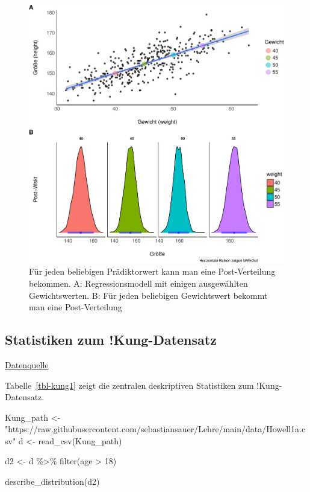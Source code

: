 \documentclass[
  a4paper,
  DIV=11]{scrreprt}
\newenvironment{Shaded}{\begin{snugshade}}{\end{snugshade}}
\newcommand{\DecValTok}[1]{\textcolor[rgb]{0.68,0.00,0.00}{#1}}
\newcommand{\FunctionTok}[1]{\textcolor[rgb]{0.28,0.35,0.67}{#1}}
\newcommand{\NormalTok}[1]{\textcolor[rgb]{0.00,0.23,0.31}{#1}}
\newcommand{\OtherTok}[1]{\textcolor[rgb]{0.00,0.23,0.31}{#1}}
\newcommand{\SpecialCharTok}[1]{\textcolor[rgb]{0.37,0.37,0.37}{#1}}
\newcommand{\StringTok}[1]{\textcolor[rgb]{0.13,0.47,0.30}{#1}}
\theoremstyle{definition}
\theoremstyle{remark}
\begin{document}
\begin{figure}

{\centering \includegraphics[width=1\textwidth,height=\textheight]{./lineare-modelle_files/figure-pdf/fig-post42-1.pdf}

}

\caption{\label{fig-post42}Für jeden beliebigen Prädiktorwert kann man
eine Post-Verteilung bekommen. A: Regressionsmodell mit einigen
ausgewählten Gewichtswerten. B: Für jeden beliebigen Gewichtswert
bekommt man eine Post-Verteilung}

\end{figure}

\hypertarget{statistiken-zum-kung-datensatz}{%
\subsection{Statistiken zum
!Kung-Datensatz}\label{statistiken-zum-kung-datensatz}}

\href{https://raw.githubusercontent.com/sebastiansauer/Lehre/main/data/Howell1a.csv}{Datenquelle}

Tabelle~\ref{tbl-kung1} zeigt die zentralen deskriptiven Statistiken zum
!Kung-Datensatz.

\begin{Shaded}
\begin{Highlighting}[]
\NormalTok{Kung\_path }\OtherTok{\textless{}{-}} \StringTok{"https://raw.githubusercontent.com/sebastiansauer/Lehre/main/data/Howell1a.csv"}  
\NormalTok{d }\OtherTok{\textless{}{-}} \FunctionTok{read\_csv}\NormalTok{(Kung\_path)  }

\NormalTok{d2 }\OtherTok{\textless{}{-}}\NormalTok{ d }\SpecialCharTok{\%\textgreater{}\%} \FunctionTok{filter}\NormalTok{(age }\SpecialCharTok{\textgreater{}} \DecValTok{18}\NormalTok{)}

\FunctionTok{describe\_distribution}\NormalTok{(d2)}
\end{Highlighting}
\end{Shaded}
\end{document}
